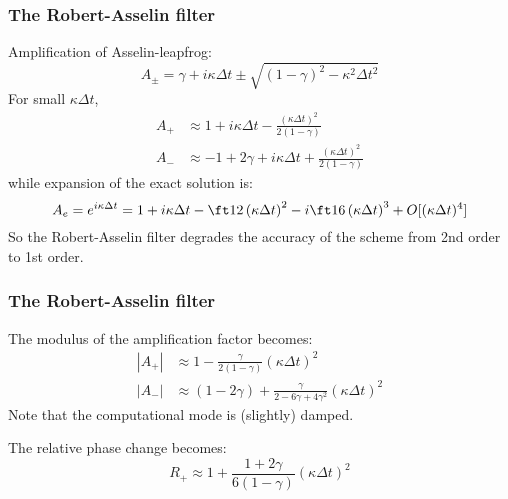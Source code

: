 \documentclass[aspectratio=43,9pt]{beamer}
\begin{document}
%
%
%
\begin{frame}
	\frametitle{The Robert-Asselin filter}
	Amplification of Asselin-leapfrog:
	\begin{equation*}
		A_\pm = \gamma + i \kappa \Delta t \pm \sqrt{\left( 1 - \gamma \right)^2 - \kappa^2 \Delta t^2}
	\end{equation*}
	For small $\kappa \Delta t$, 
	\begin{align*}
		A_+ & \approx 1 + i \kappa \Delta t -\frac{(\kappa \Delta t)^2}{2 (1-\gamma)}	\\
		A_-	&	\approx -1+2\gamma+i\kappa\Delta t+\frac{(\kappa \Delta t)^2}{2 (1-\gamma)}
	\end{align*}
	while expansion of the exact solution is:
	\begin{equation*}
		A_e = e^{i \kappa \Delta t} = 1 +i \kappa \Delta t - \ft12 \left( \kappa \Delta t \right)^2- i \ft16 \left( \kappa \Delta t \right)^3 + O[(\kappa \Delta t)^4 ]
	\end{equation*}
	So the Robert-Asselin filter degrades the accuracy of the scheme from 2nd order to 1st order.
\end{frame}
%
%
%
\begin{frame}
	\frametitle{The Robert-Asselin filter}
	The modulus of the amplification factor becomes:
	\begin{align*}
		|A_+| &\approx 1 - \frac{\gamma}{2 (1 - \gamma)} (\kappa \Delta t)^2 \\
		|A_-| &\approx (1-2\gamma) + \frac{\gamma}{2 - 6 \gamma + 4 \gamma^2} (\kappa \Delta t)^2
	\end{align*}
	Note that the computational mode is (slightly) damped.
	\par\vspace*{2ex}
	The relative phase change becomes:
	\begin{equation*}
		R_+ \approx 1 + \frac{1+2\gamma}{6 (1-\gamma)} (\kappa \Delta t)^2
	\end{equation*}
\end{frame}
%
%
%
\end{document}
